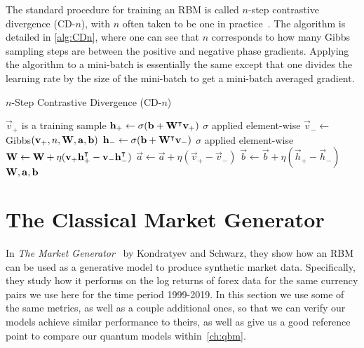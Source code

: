 The standard procedure for training an RBM is called \( n \)-step contrastive divergence (CD-\( n \)), with \( n \) often taken to be one in practice~\cite{hinton_rbm_training}.
The algorithm is detailed in \cref{alg:CDn}, where one can see that \( n \) corresponds to how many Gibbs sampling steps are between the positive and negative phase gradients.
Applying the algorithm to a mini-batch is essentially the same except that one divides the learning rate by the size of the mini-batch to get a mini-batch averaged gradient.

\begin{algorithm}
\caption{$n$-Step Contrastive Divergence (CD-$n$)}
\begin{algorithmic}[1]
        \Comment $\vec{v}_+$ is a training sample
        \State $\mathbf{h}_+ \gets \sigma(\mathbf{b} + \mathbf{W}^\intercal\mathbf{v}_+)$
            \Comment $\sigma$ applied element-wise
        \State $\vec{v}_- \gets$ Gibbs$(\mathbf{v}_+,n,\mathbf{W},\mathbf{a},\mathbf{b})$
        \State $\mathbf{h}_- \gets \sigma(\mathbf{b} + \mathbf{W}^\intercal\mathbf{v}_-)$
            \Comment $\sigma$ applied element-wise
        \State $\mathbf{W} \gets \mathbf{W} + \eta(\mathbf{v}_+ \mathbf{h}_+^\intercal - \mathbf{v}_- \mathbf{h}_-^\intercal)$
        \State $\vec{a} \gets \vec{a} + \eta(\vec{v}_+ - \vec{v}_-)$
        \State $\vec{b} \gets \vec{b} + \eta(\vec{h}_+ - \vec{h}_-)$
        \State \Return $\mathbf{W}, \mathbf{a}, \mathbf{b}$
    \EndProcedure
\end{algorithmic}
\label{alg:CDn}
\end{algorithm}


\section{The Classical Market Generator}\label{sec:classical_market_generator}
In \textit{The Market Generator}~\cite{kondratyev_2019} by Kondratyev and Schwarz, they show how an RBM can be used as a generative model to produce synthetic market data.
Specifically, they study how it performs on the log returns of forex data for the same currency pairs we use here for the time period 1999-2019.
In this section we use some of the same metrics, as well as a couple additional ones, so that we can verify our models achieve similar performance to theirs, as well as give us a good reference point to compare our quantum models within~\cref{ch:qbm}.

